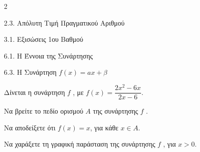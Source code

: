\begin{ylh}{2}
    \item 2.3. Απόλυτη Τιμή Πραγματικού Αριθμού
    \item 3.1. Εξισώσεις 1ου Βαθμού
    \item 6.1. Η Έννοια της Συνάρτησης
    \item 6.3. Η Συνάρτηση $f(x)=ax+\beta$
\end{ylh}
Δίνεται η συνάρτηση $f$ , με $f(x) = \dfrac{2x^2-6x}{2x-6}$.

\begin{alist}
\item Να βρείτε το πεδίο ορισμού $A$ της συνάρτησης $f$ . 
\item Να αποδείξετε ότι $f(x) = x$, για κάθε $x \in A$. 
\item Να χαράξετε τη γραφική παράσταση της συνάρτησης $f$ , για $x > 0$. 
\end{alist}

